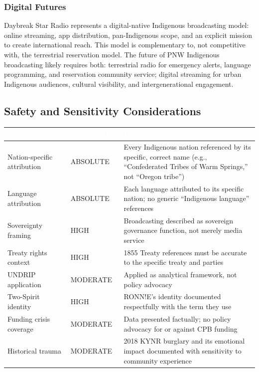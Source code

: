 \documentclass[11pt,letterpaper]{article}
\newcommand{\tableheader}[1]{\textbf{\sffamily\textcolor{white}{#1}}}
\begin{document}
\subsubsection{Digital Futures}

Daybreak Star Radio represents a digital-native Indigenous broadcasting model: online streaming, app distribution, pan-Indigenous scope, and an explicit mission to create international reach. This model is complementary to, not competitive with, the terrestrial reservation model. The future of PNW Indigenous broadcasting likely requires both: terrestrial radio for emergency alerts, language programming, and reservation community service; digital streaming for urban Indigenous audiences, cultural visibility, and intergenerational engagement.

\subsection{Safety and Sensitivity Considerations}

\begin{center}
\begin{tabularx}{\textwidth}{L{4cm}L{2.5cm}X}
\toprule
{}
\tableheader{Consideration} & \tableheader{Classification} & \tableheader{Handling Requirement} \\
\midrule
Nation-specific attribution & ABSOLUTE & Every Indigenous nation referenced by its specific, correct name (e.g., ``Confederated Tribes of Warm Springs,'' not ``Oregon tribe'') \\
Language attribution & ABSOLUTE & Each language attributed to its specific nation; no generic ``Indigenous language'' references \\
Sovereignty framing & HIGH & Broadcasting described as sovereign governance function, not merely media service \\
Treaty rights context & HIGH & 1855 Treaty references must be accurate to the specific treaty and parties \\
UNDRIP application & MODERATE & Applied as analytical framework, not policy advocacy \\
Two-Spirit identity & HIGH & RONN!E's identity documented respectfully with the term they use \\
Funding crisis coverage & MODERATE & Data presented factually; no policy advocacy for or against CPB funding \\
Historical trauma & MODERATE & 2018 KYNR burglary and its emotional impact documented with sensitivity to community experience \\
\bottomrule
\end{tabularx}
\end{center}
\end{document}
